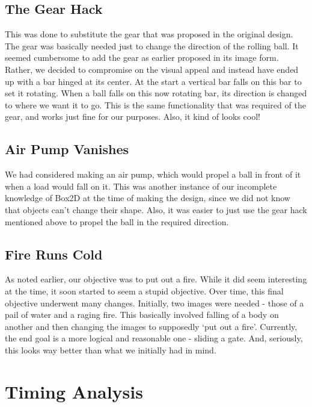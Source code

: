 \documentclass[a4paper,11pt]{article}
\begin{document}
\subsection{The Gear Hack}

This was done to substitute the gear that was proposed in the original design. The gear was basically needed just to change the direction of the rolling ball. It seemed cumbersome to add the gear as earlier proposed in its image form. Rather, we decided to compromise on the visual appeal and instead have ended up with a bar hinged at its center. At the start a vertical bar falls on this bar to set it rotating.  When a ball falls on this now rotating bar, its direction is changed to where we want it to go. This is the same functionality that was required of the gear, and works just fine for our purposes. Also, it kind of looks cool!

\subsection{Air Pump Vanishes}

We had considered making an air pump, which would propel a ball in front of it when a load would fall on it. This was another instance of our incomplete knowledge of Box2D at the time of making the design, since we did not know that objects can't change their shape. Also, it was easier to just use the gear hack mentioned above to propel the ball in the required direction.
 
\subsection{Fire Runs Cold}

As noted earlier, our objective was to put out a fire. While it did seem interesting at the time, it soon started to seem a stupid objective. Over time, this final objective underwent many changes. Initially, two images were needed - those of a pail of water and a raging fire. This basically involved falling of a body on another and then changing the images to supposedly `put out a fire'. Currently, the end goal is a more logical and reasonable one - sliding a gate. And, seriously, this looks way better than what we initially had in mind.

\section{Timing Analysis}
\end{document}
